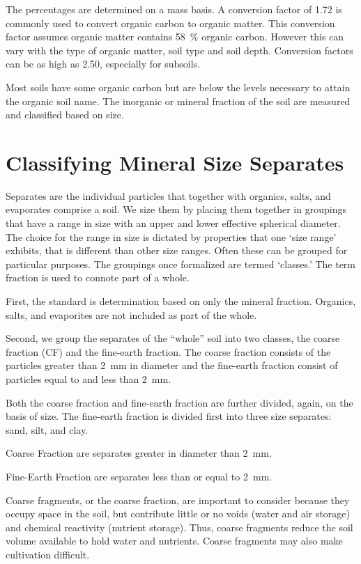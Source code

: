 \documentclass[a5paper]{report}
\begin{document}
The percentages are determined on a mass basis. A conversion factor of \num{1.72} is commonly used to convert organic carbon to organic matter. This conversion factor assumes organic matter contains \qty{58}{\percent} organic carbon. However this can vary with the type of organic matter, soil type and soil depth. Conversion factors can be as high as \num{2.50}, especially for subsoils.
    
Most soils have some organic carbon but are below the levels necessary to attain the organic soil name. The inorganic or mineral fraction of the soil are measured and classified based on size.
    
\section{Classifying Mineral Size Separates}
    
Separates are the individual particles that together with organics, salts, and evaporates comprise a soil. We size them by placing them together in groupings that have a range in size with an upper and lower effective spherical diameter. The choice for the range in size is dictated by properties that one ‘size range’ exhibits, that is different than other size ranges. Often these can be grouped for particular purposes. The groupings once formalized are termed ‘classes.’ The term fraction is used to connote part of a whole.
    
First, the standard is determination based on only the mineral fraction. Organics, salts, and evaporites are not included as part of the whole.
    
Second, we group the separates of the “whole” soil into two classes, the coarse fraction (CF) and the fine-earth fraction. The coarse fraction consists of the particles greater than \qty{2}{\milli\metre} in diameter and the fine-earth fraction consist of particles equal to and less than \qty[mode = text]{2}{\milli\metre}.
    
Both the coarse fraction and fine-earth fraction are further divided, again, on the basis of size. The fine-earth fraction is divided first into three size separates: sand, silt, and clay.
    
Coarse Fraction are separates greater in diameter than \qty[mode = text]{2}{\milli\metre}.
    
Fine-Earth Fraction are separates less than or equal to \qty[mode = text]{2}{\milli\metre}.
    
Coarse fragments, or the coarse fraction, are important to consider because they occupy space in the soil, but contribute little or no voids (water and air storage) and chemical reactivity (nutrient storage). Thus, coarse fragments reduce the soil volume available to hold water and nutrients. Coarse fragments may also make cultivation difficult.
\end{document}
